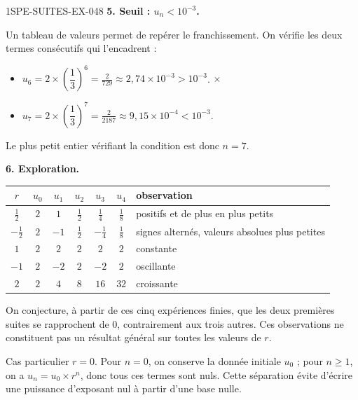 \begin{corrige}{1SPE-SUITES-EX-048}
\textbf{5. Seuil : $u_n < 10^{-3}$.}

Un tableau de valeurs permet de repérer le franchissement. On vérifie les deux termes consécutifs qui l'encadrent :
\begin{itemize}
  \item $u_6 = 2 \times \left(\dfrac{1}{3}\right)^6 = \frac{2}{729} \approx 2{,}74 \times 10^{-3} > 10^{-3}$. \(\times\)
  \item $u_7 = 2 \times \left(\dfrac{1}{3}\right)^7 = \frac{2}{2187} \approx 9{,}15 \times 10^{-4} < 10^{-3}$. \checkmark
\end{itemize}

Le plus petit entier vérifiant la condition est donc $n = 7$.

\textbf{6. Exploration.}

\begin{center}
\begin{tabular}{c|ccccc|l}
$r$ & $u_0$ & $u_1$ & $u_2$ & $u_3$ & $u_4$ & observation \\
\hline
$\frac12$ & $2$ & $1$ & $\frac12$ & $\frac14$ & $\frac18$ & positifs et de plus en plus petits \\
$-\frac12$ & $2$ & $-1$ & $\frac12$ & $-\frac14$ & $\frac18$ & signes alternés, valeurs absolues plus petites \\
$1$ & $2$ & $2$ & $2$ & $2$ & $2$ & constante \\
$-1$ & $2$ & $-2$ & $2$ & $-2$ & $2$ & oscillante \\
$2$ & $2$ & $4$ & $8$ & $16$ & $32$ & croissante \\
\end{tabular}
\end{center}

On conjecture, à partir de ces cinq expériences finies, que les deux premières suites se rapprochent de $0$, contrairement aux trois autres. Ces observations ne constituent pas un résultat général sur toutes les valeurs de $r$.

Cas particulier $r=0$. Pour $n=0$, on conserve la donnée initiale $u_0$ ; pour $n\geq1$, on a $u_n=u_0\times r^n$, donc tous ces termes sont nuls. Cette séparation évite d'écrire une puissance d'exposant nul à partir d'une base nulle.


\end{corrige}
